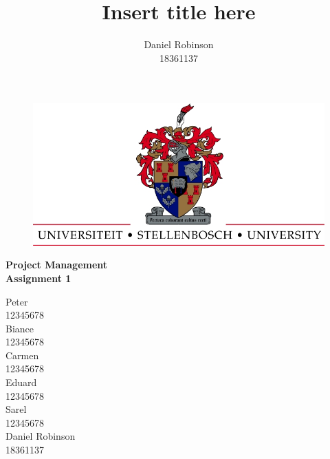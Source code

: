


\title{Insert title here}
\author{Daniel Robinson\\18361137}


    \begin{titlepage}
        \begin{center}
            \vspace*{1cm}
            
            \begin{figure}
			\centering
            \includegraphics[scale=2]{UScrest-top.jpg}
            \end{figure}
            
            \huge
            \textbf{Project Management\\Assignment 1}
            
            \vspace{1.5cm}
            
            \large
            Peter\\
            12345678\\
            \vspace{0.5cm}
            Biance\\
            12345678\\
            \vspace{0.5cm}
            Carmen\\
            12345678\\
            \vspace{0.5cm}
            Eduard\\
            12345678\\
            \vspace{0.5cm}
            Sarel\\
            12345678\\
            \vspace{0.5cm}
            Daniel Robinson\\
            18361137\\
            \vspace{3.5cm}
            

\end{center}
\end{titlepage}
